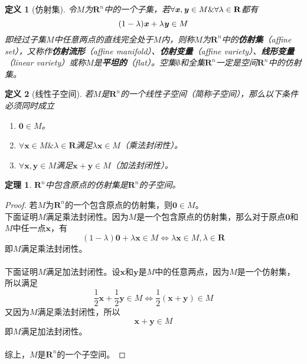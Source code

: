 \documentclass[a4paper,11pt,oneside]{article}
\newtheorem{definition}{定义}[section]
\newtheorem{theorem}{定理}[section]
\newtheorem{proof}{证明}[section]
\begin{document}
			\begin{definition}[仿射集]
				令$M$为$\textbf{R}^{n}$中的一个子集，若$\forall \textbf{\textit{x}}, \textbf{\textit{y}} \in M \& \forall \lambda \in \textbf{R}$都有
				$$(1-\lambda)\textbf{\textit{x}}+\lambda\textbf{\textit{y}} \in M$$
				即经过子集$M$中任意两点的直线完全处于$M$内，则称$M$为$\textbf{R}^{n}$中的\textbf{仿射集}（affine set），又称作\textbf{仿射流形}（affine manifold）、\textbf{仿射变量}（affine variety）、\textbf{线形变量}（linear variety）或称$M$是\textbf{平坦的}（flat）。空集$\emptyset$和全集$\textbf{R}^{n}$一定是空间$\textbf{R}^{n}$中的仿射集。
			\end{definition}
			\begin{definition}[线性子空间]
				若$M$是$\textbf{R}^{n}$的一个线性子空间（简称子空间），那么以下条件必须同时成立
				\begin{enumerate}
					\item $\textbf{0} \in M$。
					\item $\forall \textbf{x} \in M \& \lambda \in \textbf{R}$满足$\lambda \textbf{x} \in M$（乘法封闭性）。
					\item $\forall \textbf{x},\textbf{y} \in M$满足$\textbf{x}+\textbf{y} \in M$（加法封闭性）。
				\end{enumerate}
			\end{definition}
			\begin{theorem}
				\label{the:theorem1}
				$\textbf{R}^{n}$中包含原点的仿射集是$\textbf{R}^{n}$的子空间。
			\end{theorem}
			\begin{proof}
				若$M$为$\textbf{R}^{n}$的一个包含原点的仿射集，则$\textbf{0} \in M$。\\
				下面证明$M$满足乘法封闭性。因为$M$是一个包含原点的仿射集，那么对于原点$\textbf{0}$和$M$中任一点$\textbf{x}$，有
				$$(1-\lambda)\textbf{0}+\lambda \textbf{x} \in M \Leftrightarrow \lambda \textbf{x} \in M, \lambda \in \textbf{R}$$
				即$M$满足乘法封闭性。\\
				\\
				下面证明$M$满足加法封闭性。设$\textbf{x}$和$\textbf{y}$是$M$中的任意两点，因为$M$是一个仿射集，所以满足
				$$\frac{1}{2} \textbf{x} + \frac{1}{2} \textbf{y} \in M \Leftrightarrow \frac{1}{2} (\textbf{x} + \textbf{y}) \in M$$
				又因为$M$满足乘法封闭性，所以
				$$\textbf{x} + \textbf{y} \in M$$
				即$M$满足加法封闭性。\\
				\\
				综上，$M$是$\textbf{R}^{n}$的一个子空间。
			\end{proof}
\end{document}
